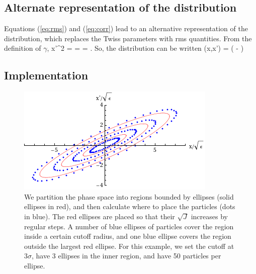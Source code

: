 \subsection{Alternate representation of the distribution}
Equations (\ref{eq:rms}) and (\ref{eq:corr}) lead to an alternative representation of the distribution, which replaces the Twiss parameters with rms quantities.
From the definition of $\gamma$, 
\Begineq
	\langle x'^2 \rangle = \varepsilon{} =  \quad \Rightarrow \quad \varepsilon = .
\Endeq
So, the distribution can be written
\Begineq
	\rho(x,x') =  \exp \left( - \right)
\Endeq

\subsection{Implementation}
\begin{figure}[htp]
	\centering \includegraphics[scale=0.75]{filledellipse.png}
	\caption{We partition the phase space into regions bounded by ellipses (solid ellipses in red), and then calculate where to place the particles (dots in blue).  The red ellipses are placed so that their $\sqrt{J}$ increases by regular steps.  A number of blue ellipses of particles cover the region inside a certain cutoff radius, and one blue ellipse covers the region outside the largest red ellipse.  For this example, we set the cutoff at 3$\sigma$, have 3 ellipses in the inner region, and have 50 particles per ellipse.}
	\label{fig:finishedellipse}
\end{figure}


